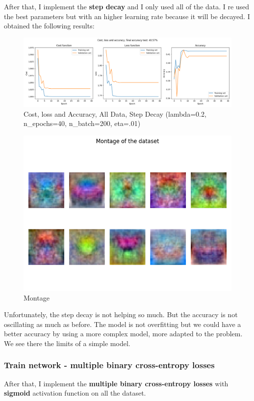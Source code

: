 \documentclass{article}
\begin{document}
After that, I implement the \textbf{step decay} and I only used all of the data. I re used the best parameters but with an higher learning rate because it will be decayed. I obtained the following results:
\begin{figure}[H]
    \centering
    \includegraphics[width=\textwidth]{Result_Pics/cost_loss_accuracy_all_data_step_decay.png}
    \caption{Cost, loss and Accuracy, All Data, Step Decay (lambda=0.2, n\_epochs=40, n\_batch=200, eta=.01)}
\end{figure}
\begin{figure}[H]
    \centering
    \includegraphics[scale=0.6]{Result_Pics/weights_all_data_step_decay.png}
    \caption{Montage}
\end{figure}

Unfortunately, the step decay is not helping so much. But the accuracy is not oscillating as much as before. The model is not overfitting but we could have a better accuracy by using a more complex model, more adapted to the problem. We see there the limits of a simple model.

\subsubsection{Train network - multiple binary cross-entropy losses}
After that, I implement the \textbf{multiple binary cross-entropy losses} with \textbf{sigmoid} activation function on all the dataset.
\end{document}
